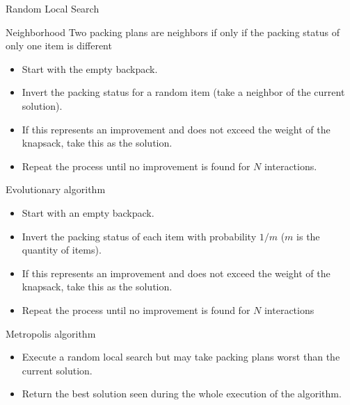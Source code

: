 \documentclass[newPxFont]{beamer}
\begin{document}
\begin{frame}[c]{Random Local Search}
\vspace{-2em}
\begin{block}{Neighborhood}
Two packing plans are neighbors if only if the packing status of only one item is different
\end{block}

\begin{itemize}
\item Start with the empty backpack.
\item Invert the packing status for a random item (take a neighbor of the current solution).
\item If this represents an improvement and does not exceed the weight of the knapsack, take this as the solution.
\item Repeat the process until no improvement is found for $N$ interactions.
\end{itemize}

\end{frame}

\begin{frame}[c]{Evolutionary algorithm}
\vspace{-2em}

\begin{itemize}
\item Start with an empty backpack.
\item Invert the packing status of each item with probability $1/m$ ($m$ is the quantity of items).
\item If this represents an improvement and does not exceed the weight of the knapsack, take this as the solution.
\item Repeat the process until no improvement is found for $N$ interactions
\end{itemize}
\end{frame}

\begin{frame}[c]{Metropolis algorithm}
\vspace{-2em}
\begin{itemize}
\item Execute a random local search but may take packing plans worst than the current solution.
\item Return the best solution seen during the whole execution of the algorithm.
\end{itemize}
\end{frame}
\end{document}
